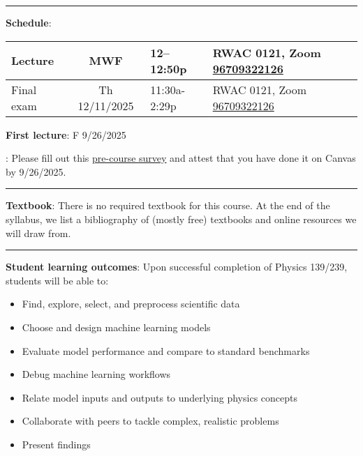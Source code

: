 \documentclass[12pt]{article}
\begin{document}
\begin{center}
	\rule{\textwidth}{0.5pt}
\end{center}

\noindent\textbf{Schedule}:
\begin{center}
	\begin{tabular}{|l|c|l|m{60mm}|}
		\hline
		Lecture    & MWF           & 12--12:50p   & RWAC	0121, Zoom \href{https://ucsd.zoom.us/j/96709322126}{96709322126}  \\\hline
		Final exam & Th 12/11/2025 & 11:30a-2:29p & RWAC 0121, Zoom \href{https://ucsd.zoom.us/j/96709322126}{96709322126} \\\hline
	\end{tabular}
\end{center}

\noindent\textbf{First lecture}: F 9/26/2025

: Please fill out this \href{https://canvas.ucsd.edu/courses/69038/quizzes/227768}{pre-course survey} and attest that you have done it on Canvas by 9/26/2025.

\begin{center}
	\rule{\textwidth}{0.5pt}
\end{center}

\noindent\textbf{Textbook}: There is no required textbook for this course.
At the end of the syllabus, we list a bibliography of (mostly free) textbooks and online resources we will draw from.

\begin{center}
	\rule{\textwidth}{0.5pt}
\end{center}

\noindent\textbf{Student learning outcomes}: Upon successful completion of Physics 139/239, students will be able to:
\begin{itemize}
	\itemsep-0.3em
	\item Find, explore, select, and preprocess scientific data
	\item Choose and design machine learning models
	\item Evaluate model performance and compare to standard benchmarks
	\item Debug machine learning workflows
	\item Relate model inputs and outputs to underlying physics concepts
	\item Collaborate with peers to tackle complex, realistic problems
	\item Present findings
\end{itemize}
\end{document}
